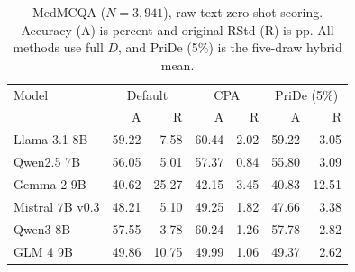 \begin{table}[htbp]
\centering\small\setlength{\tabcolsep}{4pt}
\caption{MedMCQA ($N=3,941$), raw-text zero-shot scoring. Accuracy (A) is percent and original RStd (R) is pp. All methods use full $D$, and PriDe (5\%) is the five-draw hybrid mean.}
\label{tab:results-pride-medmcqa}
\begin{tabular}{lrrrrrr}
\toprule
Model & \multicolumn{2}{c}{Default} & \multicolumn{2}{c}{CPA} & \multicolumn{2}{c}{PriDe (5\%)}\\
 & A & R & A & R & A & R\\
\midrule
Llama 3.1 8B & 59.22 & 7.58 & 60.44 & 2.02 & 59.22 & 3.05\\
Qwen2.5 7B & 56.05 & 5.01 & 57.37 & 0.84 & 55.80 & 3.09\\
Gemma 2 9B & 40.62 & 25.27 & 42.15 & 3.45 & 40.83 & 12.51\\
Mistral 7B v0.3 & 48.21 & 5.10 & 49.25 & 1.82 & 47.66 & 3.38\\
Qwen3 8B & 57.55 & 3.78 & 60.24 & 1.26 & 57.78 & 2.82\\
GLM 4 9B & 49.86 & 10.75 & 49.99 & 1.06 & 49.37 & 2.62\\
\bottomrule
\end{tabular}
\end{table}
